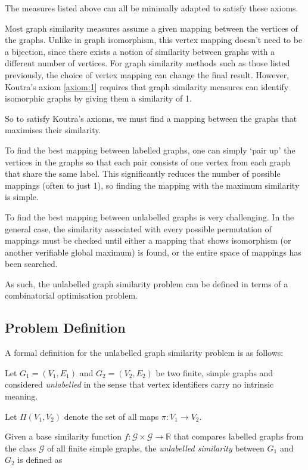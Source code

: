 The measures listed above can all be minimally adapted to satisfy these axioms.

Most graph similarity measures assume a given mapping between the vertices of the graphs. Unlike in graph isomorphism, this vertex mapping doesn't need to be a bijection, since there exists a notion of similarity between graphs with a different number of vertices. For graph similarity methods such as those listed previously, the choice of vertex mapping can change the final result. However, Koutra's axiom \ref{axiom:1} requires that graph similarity measures can identify isomorphic graphs by giving them a similarity of 1.

So to satisfy Koutra's axioms, we must find a mapping between the graphs that maximises their similarity.

To find the best mapping between labelled graphs, one can simply `pair up' the vertices in the graphs so that each pair consists of one vertex from each graph that share the same label. This significantly reduces the number of possible mappings (often to just 1), so finding the mapping with the maximum similarity is simple.

To find the best mapping between unlabelled graphs is very challenging. In the general case, the similarity associated with every possible permutation of mappings must be checked until either a mapping that shows isomorphism (or another verifiable global maximum) is found, or the entire space of mappings has been searched.

As such, the unlabelled graph similarity problem can be defined in terms of a combinatorial optimisation problem.

\subsection{Problem Definition}
A formal definition for the unlabelled graph similarity problem is as follows:

Let $G_1=(V_1,E_1)$ and $G_2=(V_2,E_2)$ be two finite, simple graphs and considered \textit{unlabelled} in the sense that vertex identifiers carry no intrinsic meaning.

Let $\Pi(V_1,V_2)$ denote the set of all maps $\pi: V_1 \to V_2$.

Given a base similarity function $f:\mathcal{G}\times\mathcal{G}\to \mathbb{R}$ that compares labelled graphs from the class $\mathcal{G}$ of all finite simple graphs, the \textit{unlabelled similarity} between $G_1$ and $G_2$ is defined as


